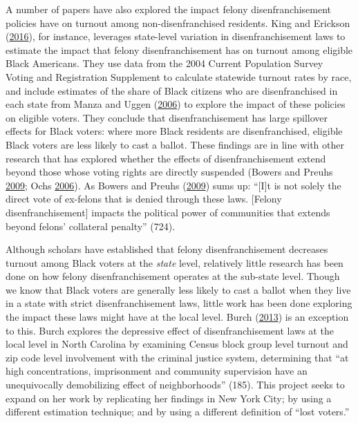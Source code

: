 \documentclass[
  12pt,
]{article}
\begin{document}
A number of papers have also explored the impact felony disenfranchisement policies have on turnout among non-disenfranchised residents. King and Erickson (\protect\hyperlink{ref-King2016}{2016}), for instance, leverages state-level variation in disenfranchisement laws to estimate the impact that felony disenfranchisement has on turnout among eligible Black Americans. They use data from the 2004 Current Population Survey Voting and Registration Supplement to calculate statewide turnout rates by race, and include estimates of the share of Black citizens who are disenfranchised in each state from Manza and Uggen (\protect\hyperlink{ref-locked_out}{2006}) to explore the impact of these policies on eligible voters. They conclude that disenfranchisement has large spillover effects for Black voters: where more Black residents are disenfranchised, eligible Black voters are less likely to cast a ballot. These findings are in line with other research that has explored whether the effects of disenfranchisement extend beyond those whose voting rights are directly suspended (Bowers and Preuhs \protect\hyperlink{ref-Bowers2009}{2009}; Ochs \protect\hyperlink{ref-Ochs2006}{2006}). As Bowers and Preuhs (\protect\hyperlink{ref-Bowers2009}{2009}) sums up: ``{[}I{]}t is not solely the direct vote of ex-felons that is denied through these laws. {[}Felony disenfranchisement{]} impacts the political power of communities that extends beyond felons' collateral penalty'' (724).

Although scholars have established that felony disenfranchisement decreases turnout among Black voters at the \emph{state} level, relatively little research has been done on how felony disenfranchisement operates at the sub-state level. Though we know that Black voters are generally less likely to cast a ballot when they live in a state with strict disenfranchisement laws, little work has been done exploring the impact these laws might have at the local level. Burch (\protect\hyperlink{ref-Burch2013}{2013}) is an exception to this. Burch explores the depressive effect of disenfranchisement laws at the local level in North Carolina by examining Census block group level turnout and zip code level involvement with the criminal justice system, determining that ``at high concentrations, imprisonment and community supervision have an unequivocally demobilizing effect of neighborhoods'' (185). This project seeks to expand on her work by replicating her findings in New York City; by using a different estimation technique; and by using a different definition of ``lost voters.''
\end{document}
